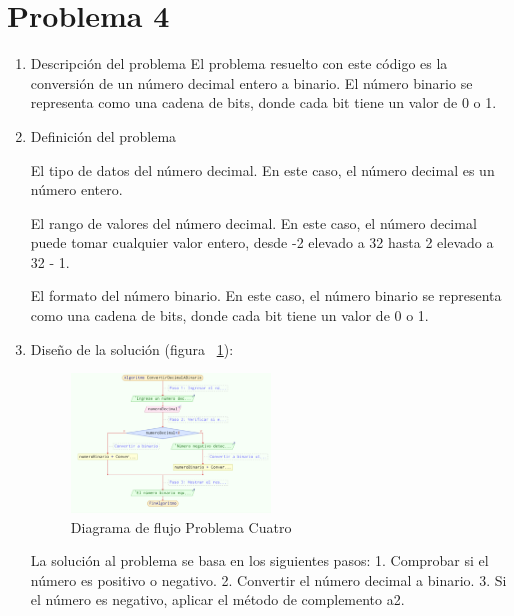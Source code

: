 \documentclass{IEEEcsmag}
\begin{document}
\section{Problema 4}
\begin{enumerate}

\item  Descripción del problema
El problema resuelto con este código es la conversión de un número decimal entero a binario. El número binario se representa como una cadena de bits, donde cada bit tiene un valor de 0 o 1.\newline

\item  Definición del problema


 El tipo de datos del número decimal. En este caso, el número decimal es un número entero.

 El rango de valores del número decimal. En este caso, el número decimal puede tomar cualquier valor entero, desde -2 elevado a 32 hasta 2 elevado a 32 - 1.

 El formato del número binario. En este caso, el número binario se representa como una cadena de bits, donde cada bit tiene un valor de 0 o 1.\newline


\item  Diseño de la solución
(figura ~\ref{fig:diagramaP4}):

\begin{figure}
\caption{Diagrama de flujo Problema Cuatro}
\centerline{\includegraphics[width=0.5\textwidth]{./latex-imagenes/diagramaprob4.png}}
\vspace*{7pt}
\label{fig:diagramaP4}
\end{figure}
La solución al problema se basa en los siguientes pasos:
1.	Comprobar si el número es positivo o negativo.
2.	Convertir el número decimal a binario.
3.	Si el número es negativo, aplicar el método de complemento a2.\newline








\end{enumerate}
\end{document}
